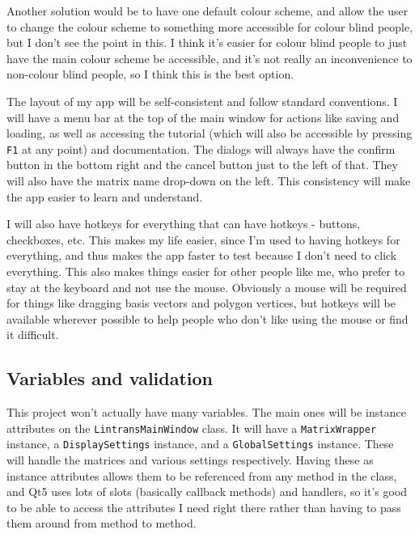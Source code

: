 \documentclass[../main.tex]{subfiles}
\begin{document}
Another solution would be to have one default colour scheme, and allow the user to change the colour scheme to something more accessible for colour blind people, but I don't see the point in this. I think it's easier for colour blind people to just have the main colour scheme be accessible, and it's not really an inconvenience to non-colour blind people, so I think this is the best option.

The layout of my app will be self-consistent and follow standard conventions. I will have a menu bar at the top of the main window for actions like saving and loading, as well as accessing the tutorial (which will also be accessible by pressing \texttt{F1} at any point) and documentation. The dialogs will always have the confirm button in the bottom right and the cancel button just to the left of that. They will also have the matrix name drop-down on the left. This consistency will make the app easier to learn and understand.

I will also have hotkeys for everything that can have hotkeys - buttons, checkboxes, etc. This makes my life easier, since I'm used to having hotkeys for everything, and thus makes the app faster to test because I don't need to click everything. This also makes things easier for other people like me, who prefer to stay at the keyboard and not use the mouse. Obviously a mouse will be required for things like dragging basis vectors and polygon vertices, but hotkeys will be available wherever possible to help people who don't like using the mouse or find it difficult.

\subsection{Variables and validation\label{subsection:variables-and-validation}}

This project won't actually have many variables. The main ones will be instance attributes on the \texttt{LintransMainWindow} class. It will have a \texttt{MatrixWrapper} instance, a \texttt{DisplaySettings} instance, and a \texttt{GlobalSettings} instance. These will handle the matrices and various settings respectively. Having these as instance attributes allows them to be referenced from any method in the class, and Qt5 uses lots of slots (basically callback methods) and handlers, so it's good to be able to access the attributes I need right there rather than having to pass them around from method to method.
\end{document}
